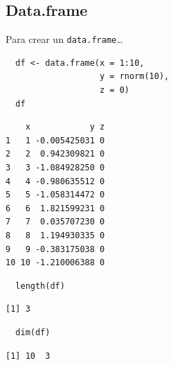 \documentclass[xcolor={usenames,svgnames,dvipsnames}]{beamer}
\begin{document}
\subsection{Data.frame}
\label{sec-3-2}
\begin{frame}[fragile,label=sec-3-2-1]{Para crear un \texttt{data.frame}\ldots{}}
 \lstset{language=R,label= ,caption= ,numbers=none}
\begin{lstlisting}
  df <- data.frame(x = 1:10,
                   y = rnorm(10),
                   z = 0)
  df
\end{lstlisting}

\begin{verbatim}
    x            y z
1   1 -0.005425031 0
2   2  0.942309821 0
3   3 -1.084928250 0
4   4 -0.980635512 0
5   5 -1.058314472 0
6   6  1.821599231 0
7   7  0.035707230 0
8   8  1.194930335 0
9   9 -0.383175038 0
10 10 -1.210006388 0
\end{verbatim}

\lstset{language=R,label= ,caption= ,numbers=none}
\begin{lstlisting}
  length(df)
\end{lstlisting}

\begin{verbatim}
[1] 3
\end{verbatim}

\lstset{language=R,label= ,caption= ,numbers=none}
\begin{lstlisting}
  dim(df)
\end{lstlisting}

\begin{verbatim}
[1] 10  3
\end{verbatim}
\end{frame}
\end{document}
